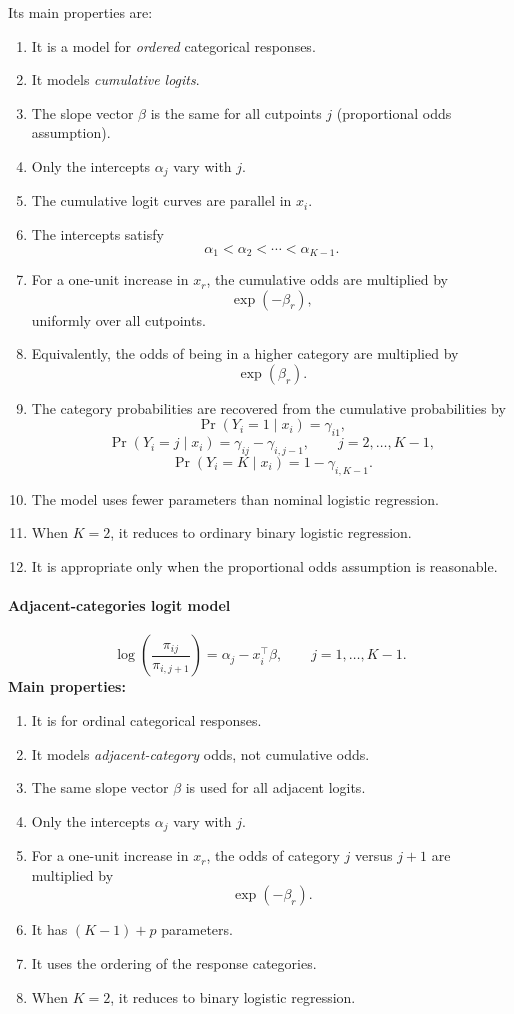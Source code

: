 \documentclass[11pt]{article}
\theoremstyle{definition}
\begin{document}
Its main properties are:
\begin{enumerate}
    \item It is a model for \emph{ordered} categorical responses.
    \item It models \emph{cumulative logits}.
    \item The slope vector \(\beta\) is the same for all cutpoints \(j\) (proportional odds assumption).
    \item Only the intercepts \(\alpha_j\) vary with \(j\).
    \item The cumulative logit curves are parallel in \(x_i\).
    \item The intercepts satisfy
    \[
    \alpha_1<\alpha_2<\cdots<\alpha_{K-1}.
    \]
    \item For a one-unit increase in \(x_r\), the cumulative odds are multiplied by
    \[
    \exp(-\beta_r),
    \]
    uniformly over all cutpoints.
    \item Equivalently, the odds of being in a higher category are multiplied by
    \[
    \exp(\beta_r).
    \]
    \item The category probabilities are recovered from the cumulative probabilities by
    \[
    \Pr(Y_i=1\mid x_i)=\gamma_{i1},
    \]
    \[
    \Pr(Y_i=j\mid x_i)=\gamma_{ij}-\gamma_{i,j-1}, \qquad j=2,\dots,K-1,
    \]
    \[
    \Pr(Y_i=K\mid x_i)=1-\gamma_{i,K-1}.
    \]
    \item The model uses fewer parameters than nominal logistic regression.
    \item When \(K=2\), it reduces to ordinary binary logistic regression.
    \item It is appropriate only when the proportional odds assumption is reasonable.
\end{enumerate}

\paragraph{Adjacent-categories logit model}
\[
\log\left(\frac{\pi_{ij}}{\pi_{i,j+1}}\right)=\alpha_j-x_i^\top\beta,
\qquad j=1,\dots,K-1.
\]
\textbf{Main properties:}
\begin{enumerate}
    \item It is for ordinal categorical responses.
    \item It models \emph{adjacent-category} odds, not cumulative odds.
    \item The same slope vector \(\beta\) is used for all adjacent logits.
    \item Only the intercepts \(\alpha_j\) vary with \(j\).
    \item For a one-unit increase in \(x_r\), the odds of category \(j\) versus \(j+1\) are multiplied by
    \[
    \exp(-\beta_r).
    \]
    \item It has \((K-1)+p\) parameters.
    \item It uses the ordering of the response categories.
    \item When \(K=2\), it reduces to binary logistic regression.
\end{enumerate}
\end{document}
